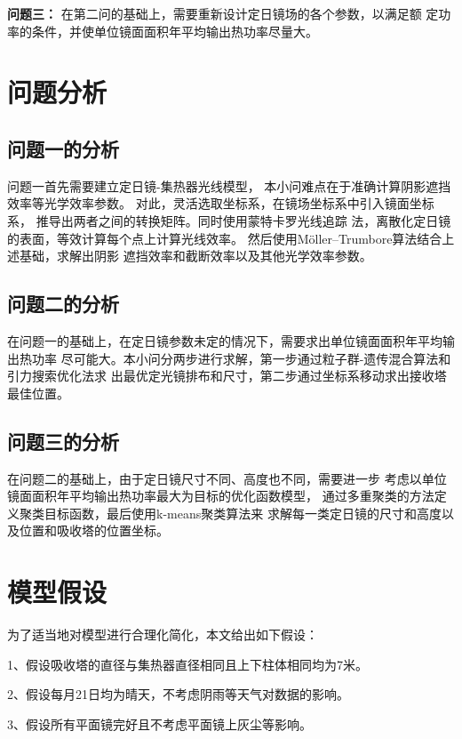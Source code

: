 \documentclass{数学建模}
\begin{document}
\textbf{问题三：}
在第二问的基础上，需要重新设计定日镜场的各个参数，以满足额
定功率的条件，并使单位镜面面积年平均输出热功率尽量大。

\section{问题分析}

\subsection{问题一的分析}
问题一首先需要建立定日镜-集热器光线模型，
本小问难点在于准确计算阴影遮挡效率等光学效率参数。
对此，灵活选取坐标系，在镜场坐标系中引入镜面坐标系，
推导出两者之间的转换矩阵。同时使用蒙特卡罗光线追踪
法，离散化定日镜的表面，等效计算每个点上计算光线效率。
然后使用Möller–Trumbore算法结合上述基础，求解出阴影
遮挡效率和截断效率以及其他光学效率参数。

\subsection{问题二的分析}

在问题一的基础上，在定日镜参数未定的情况下，需要求出单位镜面面积年平均输出热功率
尽可能大。本小问分两步进行求解，第一步通过粒子群-遗传混合算法和引力搜索优化法求
出最优定光镜排布和尺寸，第二步通过坐标系移动求出接收塔最佳位置。


\subsection{问题三的分析}

在问题二的基础上，由于定日镜尺寸不同、高度也不同，需要进一步
考虑以单位镜面面积年平均输出热功率最大为目标的优化函数模型，
通过多重聚类的方法定义聚类目标函数，最后使用k-means聚类算法来
求解每一类定日镜的尺寸和高度以及位置和吸收塔的位置坐标。

\section{模型假设}
为了适当地对模型进行合理化简化，本文给出如下假设：

1、假设吸收塔的直径与集热器直径相同且上下柱体相同均为7米。

2、假设每月21日均为晴天，不考虑阴雨等天气对数据的影响。

3、假设所有平面镜完好且不考虑平面镜上灰尘等影响。
\end{document}
